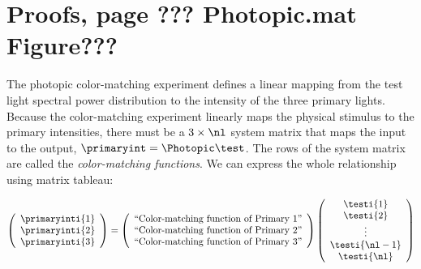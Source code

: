 


\doublesp

\section*{Proofs, page ??? Photopic.mat Figure???}

The photopic color-matching experiment defines a linear mapping from
the test light spectral power distribution to the intensity of the
three primary lights.  Because the color-matching experiment linearly
maps the physical stimulus to the primary intensities, there must be a
$3 \times \nl$ system matrix that maps the input to the output,
$\primaryint = \Photopic \test$.  The rows of the system matrix are
called the {\em color-matching functions}.  We can express the whole
relationship using matrix tableau:

\begin{equation}
  \left ( 
   \begin{array}{c}
   \primaryinti{1} \\
   \primaryinti{2} \\
   \primaryinti{3} \\
   \end{array}
   \right ) =
  \left ( 
   \begin{array}{c}
      \mbox{``Color-matching function of Primary 1''} \\
      \mbox{``Color-matching function of Primary 2''} \\
      \mbox{``Color-matching function of Primary 3''} \\
   \end{array}
  \right )
  \left (
   \begin{array}{c}
    \testi{1} \\
    \testi{2} \\
    \vdots \\
    \testi{\nl-1} \\
    \testi{\nl} \\
   \end{array}
  \right )
\end{equation}






